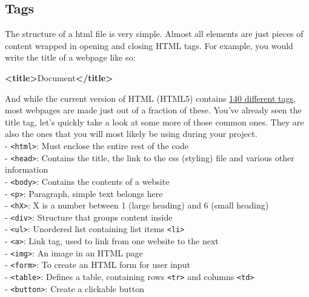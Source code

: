 \documentclass[
]{book}
\newenvironment{Shaded}{\begin{snugshade}}{\end{snugshade}}
\newcommand{\KeywordTok}[1]{\textcolor[rgb]{0.13,0.29,0.53}{\textbf{#1}}}
\newcommand{\NormalTok}[1]{#1}
\begin{document}
\hypertarget{tags}{%
\subsection*{Tags}\label{tags}}

The structure of a html file is very simple. Almost all elements are just pieces of content wrapped in opening and closing HTML tags. For example, you would write the title of a webpage like so:

\begin{Shaded}
\begin{Highlighting}[]
\KeywordTok{\textless{}title\textgreater{}}\NormalTok{Document}\KeywordTok{\textless{}/title\textgreater{}}  
\end{Highlighting}
\end{Shaded}

And while the current version of HTML (HTML5) contains \href{https://www.w3schools.com/TAGS/default.ASP}{140 different tags}, most webpages are made just out of a fraction of these. You've already seen the title tag, let's quickly take a look at some more of those common ones. They are also the ones that you will most likely be using during your project.\\
- \texttt{\textless{}html\textgreater{}}: Must enclose the entire rest of the code\\
- \texttt{\textless{}head\textgreater{}}: Contains the title, the link to the css (styling) file and various other information\\
- \texttt{\textless{}body\textgreater{}}: Contains the contents of a website\\
- \texttt{\textless{}p\textgreater{}}: Paragraph, simple text belongs here\\
- \texttt{\textless{}hX\textgreater{}}: X is a number between 1 (large heading) and 6 (small heading)\\
- \texttt{\textless{}div\textgreater{}}: Structure that groups content inside\\
- \texttt{\textless{}ul\textgreater{}}: Unordered list containing list items \texttt{\textless{}li\textgreater{}}\\
- \texttt{\textless{}a\textgreater{}}: Link tag, used to link from one website to the next\\
- \texttt{\textless{}img\textgreater{}}: An image in an HTML page\\
- \texttt{\textless{}form\textgreater{}}: To create an HTML form for user input\\
- \texttt{\textless{}table\textgreater{}}: Defines a table, containing rows \texttt{\textless{}tr\textgreater{}} and columns \texttt{\textless{}td\textgreater{}}\\
- \texttt{\textless{}button\textgreater{}}: Create a clickable button
\end{document}
